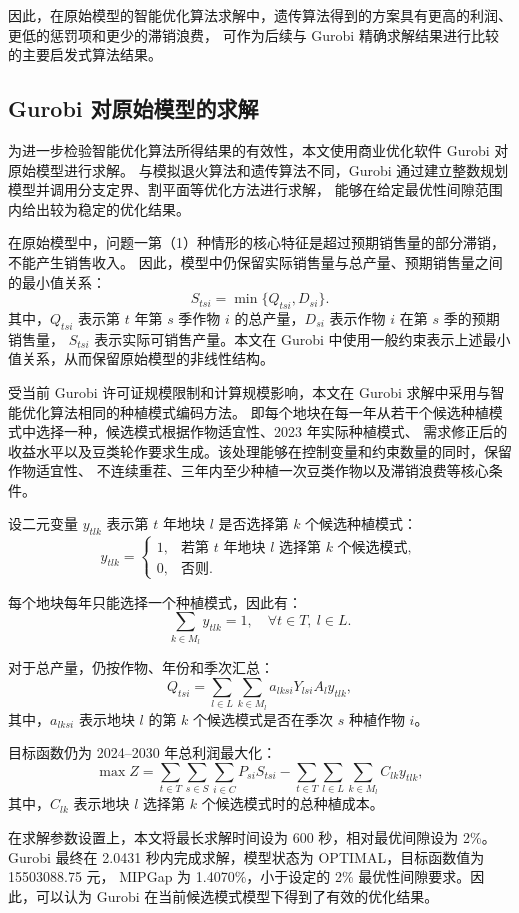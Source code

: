 \documentclass[12pt,a4paper]{ctexart}
\begin{document}
因此，在原始模型的智能优化算法求解中，遗传算法得到的方案具有更高的利润、更低的惩罚项和更少的滞销浪费，
可作为后续与 Gurobi 精确求解结果进行比较的主要启发式算法结果。
\subsection{Gurobi 对原始模型的求解}

为进一步检验智能优化算法所得结果的有效性，本文使用商业优化软件 Gurobi 对原始模型进行求解。
与模拟退火算法和遗传算法不同，Gurobi 通过建立整数规划模型并调用分支定界、割平面等优化方法进行求解，
能够在给定最优性间隙范围内给出较为稳定的优化结果。

在原始模型中，问题一第（1）种情形的核心特征是超过预期销售量的部分滞销，不能产生销售收入。
因此，模型中仍保留实际销售量与总产量、预期销售量之间的最小值关系：
\[
S_{tsi}=\min\{Q_{tsi},D_{si}\}.
\]
其中，$Q_{tsi}$ 表示第 $t$ 年第 $s$ 季作物 $i$ 的总产量，$D_{si}$ 表示作物 $i$ 在第 $s$ 季的预期销售量，
$S_{tsi}$ 表示实际可销售产量。本文在 Gurobi 中使用一般约束表示上述最小值关系，从而保留原始模型的非线性结构。

受当前 Gurobi 许可证规模限制和计算规模影响，本文在 Gurobi 求解中采用与智能优化算法相同的种植模式编码方法。
即每个地块在每一年从若干个候选种植模式中选择一种，候选模式根据作物适宜性、2023 年实际种植模式、
需求修正后的收益水平以及豆类轮作要求生成。该处理能够在控制变量和约束数量的同时，保留作物适宜性、
不连续重茬、三年内至少种植一次豆类作物以及滞销浪费等核心条件。

设二元变量 $y_{tlk}$ 表示第 $t$ 年地块 $l$ 是否选择第 $k$ 个候选种植模式：
\[
y_{tlk}=
\begin{cases}
1, & \text{若第 }t\text{ 年地块 }l\text{ 选择第 }k\text{ 个候选模式},\\
0, & \text{否则}.
\end{cases}
\]

每个地块每年只能选择一个种植模式，因此有：
\[
\sum_{k\in M_l}y_{tlk}=1,
\quad \forall t\in T,\ l\in L.
\]

对于总产量，仍按作物、年份和季次汇总：
\[
Q_{tsi}=\sum_{l\in L}\sum_{k\in M_l}a_{lksi}Y_{lsi}A_l y_{tlk},
\]
其中，$a_{lksi}$ 表示地块 $l$ 的第 $k$ 个候选模式是否在季次 $s$ 种植作物 $i$。

目标函数仍为 2024--2030 年总利润最大化：
\[
\max Z=
\sum_{t\in T}\sum_{s\in S}\sum_{i\in C}P_{si}S_{tsi}
-
\sum_{t\in T}\sum_{l\in L}\sum_{k\in M_l}C_{lk}y_{tlk},
\]
其中，$C_{lk}$ 表示地块 $l$ 选择第 $k$ 个候选模式时的总种植成本。

在求解参数设置上，本文将最长求解时间设为 600 秒，相对最优间隙设为 2\%。
Gurobi 最终在 2.0431 秒内完成求解，模型状态为 OPTIMAL，目标函数值为 15503088.75 元，
MIPGap 为 1.4070\%，小于设定的 2\% 最优性间隙要求。因此，可以认为 Gurobi 在当前候选模式模型下得到了有效的优化结果。
\end{document}
